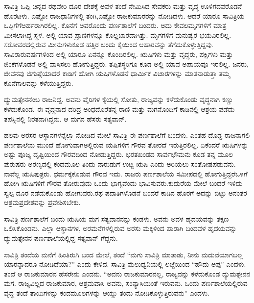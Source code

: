 \vskip 0.1cm

ಸಾವಿತ್ರಿ ಒಪ್ಪಿ ಚಿನ್ನದ ರಥವೇರಿ ದೂರ ದೇಶಕ್ಕೆ ಅವಳ ತಂದೆ ನೇಮಿಸಿದ ಸೇವಕರು ಮತ್ತು ವೃದ್ಧ ಊಳಿಗದವರೊಡನೆ ಹೊರಟಳು. ಎಷ್ಟೋ ರಾಜಧಾನಿಗಳಲ್ಲಿ ತಂಗಿ,\break ಎಷ್ಟೋ ರಾಜಕುಮಾರರನ್ನು ನೋಡಿದಳು. ಆದರೆ ಯಾರೂ ಸಾವಿತ್ರಿಯ ಒಪ್ಪಿಗೆಗೆ\break ಅರ್ಹರಾಗಿರಲಿಲ್ಲ. ಕೊನೆಗೆ ಅವರೊಂದು ಪರ್ಣಶಾಲೆಗೆ ಬಂದರು. ಅದು ಕೇವಲ\break ಮೃಗಗಳಿಗೆ ಮಾತ್ರ ಮೀಸಲಾಗಿದ್ದ ಸ್ಥಳ. ಅಲ್ಲಿ ಯಾವ ಪ್ರಾಣಿಗಳನ್ನೂ ಕೊಲ್ಲಬಾರದಾಗಿತ್ತು. ಮೃಗಗಳಿಗೆ ಮನುಷ್ಯರ ಭಯವಿರಲಿಲ್ಲ. ಸರೋವರದಲ್ಲಿರುವ ಮೀನುಗಳು\break ಕೂಡ ಹತ್ತಿರ ಬಂದು ಕೈಯಿಂದ ಆಹಾರವನ್ನು ತೆಗೆದುಕೊಳ್ಳುತ್ತಿದ್ದವು. ಸಾವಿರಾರು\break ವರ್ಷಗಳಿಂದ ಅಲ್ಲಿ ಯಾರೂ ಏನನ್ನೂ ಕೊಂದಿರಲಿಲ್ಲ. ಋಷಿಗಳು ಮತ್ತು ವೃದ್ಧರು, ಪಕ್ಷಿಗಳು ಮತ್ತು ಜಿಂಕೆಗಳೊಡನೆ ಅಲ್ಲಿ ವಾಸಿಸಲು ಹೋಗುತ್ತಿದ್ದರು. ತಪ್ಪಿತಸ್ಥರಿಗೂ ಕೂಡ ಅಲ್ಲಿ ಯಾವ ಅಪಾಯವೂ ಇರಲಿಲ್ಲ. ಜನರು, ಜೀವನವು ಜಿಗುಪ್ಸೆಯಾದರೆ ಕಾಡಿಗೆ ಹೋಗಿ ಋಷಿಗಳೊಡನೆ ಧಾರ್ಮಿಕ ವಿಚಾರಗಳನ್ನು ಮಾತನಾಡುತ್ತಾ ತಮ್ಮ ಕೊನೆಗಾಲವನ್ನು ಕಳೆಯುತ್ತಿದ್ದರು.

\vskip 0.1cm

ದ್ಯುಮತ್ಸೇನನೆಂಬ ರಾಜನಿದ್ದ. ಅವನು ವೈರಿಗಳ ಕೈಯಲ್ಲಿ ಸೋತು, ರಾಜ್ಯವನ್ನು ಕಳೆದುಕೊಂಡು ವೃದ್ಧನಾಗಿ ಕಣ್ಣು ಕಳೆದುಕೊಂಡ. ಈ ವೃದ್ಧನಾದ ದರಿದ್ರ ಅಂಧದೊರೆ\break ತನ್ನ ರಾಣಿ ಮತ್ತು ಮಗನೊಂದಿಗೆ ಕಾಡಿನಲ್ಲಿ ಆಶ್ರಯ ಪಡೆದು ತಪಸ್ಸಿನಲ್ಲಿ ನಿರತನಾಗಿದ್ದನು. ಆ ಮಗನ ಹೆಸರು ಸತ್ಯವಾನ್​.

\vskip 0.1cm

ಹಲವು ಅರಸರ ಆಸ್ಥಾನಗಳನ್ನೆಲ್ಲಾ ನೋಡಿದ ಮೇಲೆ ಸಾವಿತ್ರಿ ಈ ಪರ್ಣಶಾಲೆಗೆ ಬಂದಳು. ಎಂತಹ ದೊಡ್ಡ ರಾಜನಾಗಲಿ ಪರ್ಣಶಾಲೆಯ ಮುಂದೆ ಹೋಗುವಾಗ\break ಅಲ್ಲಿರುವ ಋಷಿಗಳಿಗೆ ಗೌರವ ತೋರದೆ ಇರುತ್ತಿರಲಿಲ್ಲ. ಏಕೆಂದರೆ ಋಷಿಗಳನ್ನು ಅಷ್ಟು ಪೂಜ್ಯ ದೃಷ್ಟಿಯಿಂದ ಗೌರವದಿಂದ ನೋಡುತ್ತಿದ್ದರು. ಭರತಖಂಡದ ಸಾರ್ವಭೌಮನು ಕೂಡ ತನ್ನ ಮೂಲ ಪುರುಷರು ಅರಣ್ಯದಲ್ಲಿ ಕಂದಮೂಲ ತಿಂದು ನಾರುಡುಗೆ ಉಟ್ಟ ಋಷಿ ಎಂದು ಅರಿಯಲು ಸಂತೋಷಪಡುವನು. ನಾವೆಲ್ಲ ಋಷಿಪುತ್ರರು. ಧರ್ಮಕ್ಕೆ\break ಕೊಡುವ ಗೌರವ ಇದು. ರಾಜರು ಪರ್ಣಶಾಲೆಯ ಸಮೀಪದಲ್ಲಿ ಹೋಗುತ್ತಿದ್ದರೆ\break ಒಳಗೆ ಹೋಗಿ ಋಷಿಗಳಿಗೆ ಗೌರವ ತೋರುವುದು ಒಂದು ಭಾಗ್ಯವೆಂದು ಭಾವಿಸುವರು.\break ಕುದುರೆಯ ಮೇಲೆ ಬಂದರೆ ಇಳಿದು ಸ್ವಲ್ಪ ದೂರ ನಡೆದುಕೊಂಡು ಹೋಗುವರು.\break ರಥ ಪದಾತಿಗಳೊಡನೆ ಬಂದರೆ ಕಾಡಿನ ಹೊರಗೆ ಅದನ್ನು ಬಿಟ್ಟು ಅನಂತರ ಆಶ್ರಮ\break ಪ್ರದೇಶವನ್ನು ಪ್ರವೇಶಿಸಬೇಕು.

\vskip 0.1cm

ಸಾವಿತ್ರಿ ಪರ್ಣಶಾಲೆಗೆ ಬಂದು ಋಷಿಯ ಮಗ ಸತ್ಯವಾನನನ್ನು ಕಂಡಳು. ಅವನು ಅವಳ ಹೃದಯವನ್ನು ತಕ್ಷಣ ಒಲಿಸಿಕೊಂಡನು. ಎಲ್ಲಾ ಆಸ್ಥಾನಗಳ, ಅರಮನೆಗಳಲ್ಲಿರುವ ಅರಸು ಮಕ್ಕಳಿಂದ ಪಾರಾಗಿ ಬಂದವಳ ಹೃದಯವನ್ನು ದ್ಯುಮತ್ಸೇನನ ಪರ್ಣಶಾಲೆಯಲ್ಲಿದ್ದ ಸತ್ಯವಾನ್​ ಗೆದ್ದನು.

\vskip 0.1cm

ಸಾವಿತ್ರಿ ತಂದೆಯ ಮನೆಗೆ ಹಿಂತಿರುಗಿ ಬಂದ ಮೇಲೆ, ತಂದೆ “ಮಗು ಸಾವಿತ್ರಿ ಮಾತಾಡು, ನೀನು ಮದುವೆಯಾಗಬಲ್ಲ ಯಾರನ್ನಾದರೂ ನೋಡಿದೆಯಾ?” ಎಂದು ಕೇಳಿದ. ಸಾವಿತ್ರಿ ಮೆಲುಧ್ವನಿಯಲ್ಲಿ ಲಜ್ಜೆಯಿಂದ “ಹೌದು ಅಪ್ಪ” ಎಂದಳು. ತಂದೆ ಆ ರಾಜಕುಮಾರನ ಹೆಸರೇನು ಎಂದನು. “ಅವನು ರಾಜಕುಮಾರನಲ್ಲ, ರಾಜ್ಯವನ್ನು ಕಳೆದುಕೊಂಡ ದ್ಯುಮತ್ಸೇನನ ಮಗ. ರಾಜ್ಯವಿಲ್ಲದ ರಾಜಕುಮಾರ, ಆಶ್ರಮವಾಸಿ ಅವನು, ಸಂನ್ಯಾಸಿಯಂತೆ ಇರುವನು. ಒಂದು ಪರ್ಣಶಾಲೆಯಲ್ಲಿರುವ ವೃದ್ಧ ತಂದೆ ತಾಯಿಗಳನ್ನು ಕಂದಮೂಲಗಳನ್ನು ಆಯ್ದು ತಂದು ನೋಡಿಕೊಳ್ಳುತ್ತಿರುವನು” ಎಂದಳು.

